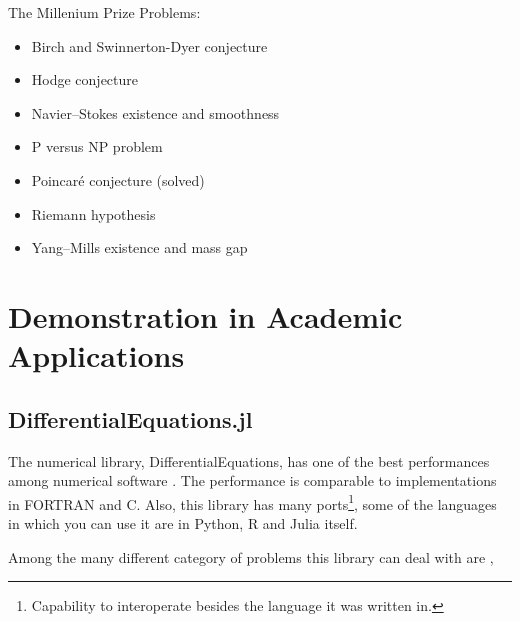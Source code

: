 \documentclass[
12pt,				%
openright,			%
oneside,			%
a4paper,			%
brazil,				%
english,			%
]{abntex2}
\begin{document}
The Millenium Prize Problems:

\begin{itemize}
  \item Birch and Swinnerton-Dyer conjecture
  \item Hodge conjecture
  \item Navier–Stokes existence and smoothness
  \item P versus NP problem
  \item Poincaré conjecture (solved)
  \item Riemann hypothesis
  \item Yang–Mills existence and mass gap
\end{itemize}

\section{Demonstration in Academic Applications}

\subsection{DifferentialEquations.jl}

The numerical library, DifferentialEquations, has one of the best
performances among numerical software
\cite{rackauckas2017differentialequations}. The performance is
comparable to implementations in FORTRAN and C. Also, this library has
many ports\footnote{Capability to interoperate besides the language it
was written in.}, some of the languages in which you can use it are in Python, R and Julia itself.

Among the many different category of problems this library can deal
with are \cite{rackauckas2019confederated,rackauckas2017adaptive,rackauckas_stability-optimized_2018,sykora2020stochasticdelaydiffeq,rackauckas2018comparison,rackauckas2019diffeqflux,rackauckas2020universal,gowda2019sparsity,ma2021modelingtoolkit},
\end{document}
